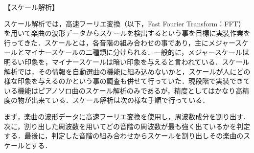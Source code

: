【スケール解析】
\par
スケール解析では，高速フーリエ変換（以下，Fast Fourier Transform：FFT）を用いて楽曲の波形データからスケールを検出するという事を目標に実装作業を行ってきた．スケールとは，各音階の組み合わせの事であり，主にメジャースケールとマイナースケールの二種類に分けられる．一般的に，メジャースケールは明るい印象を，マイナースケールは暗い印象を与えると言われている．スケール解析では，その情報を自動選曲の機能に組み込めないかと，スケールが人にどの様な印象を与えるのかという事の調査も併せて行っていた．現段階で実装できている機能はピアノソロ曲のスケール解析のみであるが，精度としてはかなり高精度の物が出来ている．スケール解析は次の様な手順で行っている．\par
まず，楽曲の波形データに高速フーリエ変換を使用し，周波数成分を割り出す．次に，割り出した周波数を用いてどの音階の周波数が最も強く出ているかを判定する．最後に，判定した音階の組み合わせからスケールを割り出しその楽曲のスケールとする．
